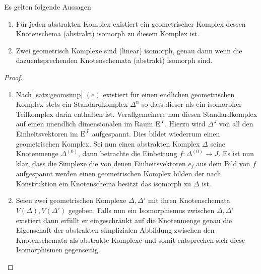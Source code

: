 \begin{Satz}
  Es gelten folgende Aussagen
  \begin{enumerate}[(1)]
  \item Für jeden abstrakten Komplex existiert ein geometrischer
    Komplex dessen Knotenschema (abstrakt) isomorph zu diesem Komplex
    ist.
  \item Zwei geometrisch Komplexe sind (linear) isomorph, genau dann
    wenn die dazuentsprechenden Knotenschemata (abstrakt) isomorph
    sind.
  \end{enumerate}
  \begin{proof}
    \begin{enumerate}[(1)]
    \item Nach \cref{satz:geomsimp} $(e)$ existiert für einen
      endlichen geometrischen Komplex stets ein Standardkomplex
      $\Delta^n$ so dass dieser als ein isomorpher Teilkomplex darin
      enthalten ist. Verallgemeinere nun diesen Standardkomplex auf
      einen unendlich dimensionalen im Raum $\operatorname{E}^J$. Hierzu wird
      $\Delta^J$ von all den Einheitsvektoren im $\operatorname{E}^J$
      aufgespannt. Dies bildet wiederrum einen geometrischen Komplex.
      Sei nun einen abstrakten Komplex $\Delta$ seine Knotenmenge
      $\Delta^{(0)}$, dann betrachte die Einbettung
      $f : \Delta^{(0)} \rightarrow J$. Es ist nun klar, dass die
      Simplexe die von denen Einheitsvektoren $e_j$ aus dem Bild von
      $f$ aufgespannt werden einen geometrischen Komplex bilden der
      nach Konstruktion ein Knotenschema besitzt das isomorph zu
      $\Delta$ ist.

    \item Seien zwei geometrischen Komplexe $\Delta,\Delta'$ mit ihren
      Knotenschemata $V(\Delta),V(\Delta')$ gegeben. Falls nun ein
      Isomorphismus zwischen $\Delta,\Delta'$ existiert dann erfüllt
      er eingeschränkt auf die Knotenmenge genau die Eigenschaft der
      abstrakten simplizialen Abbildung zwischen den Knotenschemata
      als abstrakte Komplexe und somit entsprechen sich diese
      Isomorphismen gegenseitig.
    \end{enumerate}
  \end{proof}
\end{Satz}



